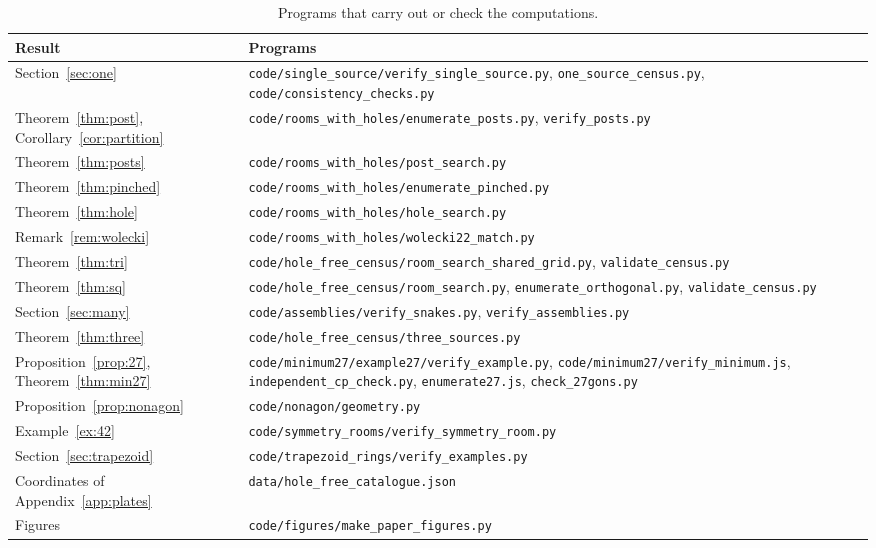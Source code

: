 \documentclass[11pt,a4paper]{article}
\theoremstyle{plain}
\theoremstyle{definition}
\theoremstyle{remark}
\numberwithin{equation}{section}
\begin{document}
\begin{table}[htbp]
\centering\small
\begin{tabular}{@{}>{\raggedright\arraybackslash}p{}>{\raggedright\arraybackslash}p{}@{}}
\toprule
Result & Programs\\
\midrule
Section~\ref{sec:one} & \nolinkurl{code/single_source/verify_single_source.py}, \nolinkurl{one_source_census.py}, \nolinkurl{code/consistency_checks.py}\\
Theorem~\ref{thm:post}, Corollary~\ref{cor:partition} & \nolinkurl{code/rooms_with_holes/enumerate_posts.py}, \nolinkurl{verify_posts.py}\\
Theorem~\ref{thm:posts} & \nolinkurl{code/rooms_with_holes/post_search.py}\\
Theorem~\ref{thm:pinched} & \nolinkurl{code/rooms_with_holes/enumerate_pinched.py}\\
Theorem~\ref{thm:hole} & \nolinkurl{code/rooms_with_holes/hole_search.py}\\
Remark~\ref{rem:wolecki} & \nolinkurl{code/rooms_with_holes/wolecki22_match.py}\\
Theorem~\ref{thm:tri} & \nolinkurl{code/hole_free_census/room_search_shared_grid.py}, \nolinkurl{validate_census.py}\\
Theorem~\ref{thm:sq} & \nolinkurl{code/hole_free_census/room_search.py}, \nolinkurl{enumerate_orthogonal.py}, \nolinkurl{validate_census.py}\\
Section~\ref{sec:many} & \nolinkurl{code/assemblies/verify_snakes.py}, \nolinkurl{verify_assemblies.py}\\
Theorem~\ref{thm:three} & \nolinkurl{code/hole_free_census/three_sources.py}\\
Proposition~\ref{prop:27}, Theorem~\ref{thm:min27} & \nolinkurl{code/minimum27/example27/verify_example.py}, \nolinkurl{code/minimum27/verify_minimum.js}, \nolinkurl{independent_cp_check.py}, \nolinkurl{enumerate27.js}, \nolinkurl{check_27gons.py}\\
Proposition~\ref{prop:nonagon} & \nolinkurl{code/nonagon/geometry.py}\\
Example~\ref{ex:42} & \nolinkurl{code/symmetry_rooms/verify_symmetry_room.py}\\
Section~\ref{sec:trapezoid} & \nolinkurl{code/trapezoid_rings/verify_examples.py}\\
Coordinates of Appendix~\ref{app:plates} & \nolinkurl{data/hole_free_catalogue.json}\\
Figures & \nolinkurl{code/figures/make_paper_figures.py}\\
\bottomrule
\end{tabular}
\caption{Programs that carry out or check the computations.}
\label{tab:code}
\end{table}
\end{document}
